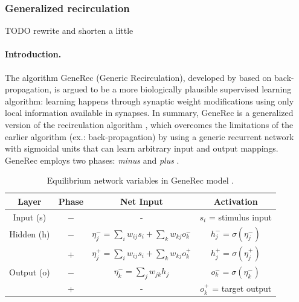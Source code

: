 \subsubsection{Generalized recirculation}
\label{models-generec} 

TODO rewrite and shorten a little 

\paragraph{Introduction.} 
The algorithm GeneRec (Generic Recirculation), developed by \citet{o1996bio} based on back-propagation, is argued to be a more biologically plausible supervised learning algorithm: learning happens through synaptic weight modifications using only local information available in synapses. In summary, GeneRec is a generalized version of the recirculation algorithm \citet{hinton1988learning}, which overcomes the limitations of the earlier algorithm (ex.: back-propagation) by using a generic recurrent network with sigmoidal units that can learn arbitrary input and output mappings. GeneRec employs two phases: \emph{minus} and \emph{plus} \citep{da2011advances, schneider2009application}. 


\begin{table}
  \centering
  \begin{tabular}{|cccc|}
    \hline
    Layer & Phase & Net Input & Activation\\
    \hline
    Input (s)    & $-$ & - & $s_i$ = stimulus input\\
    \hline
    Hidden (h)   & $-$ & \hspace{0.3cm}$\eta^{-}_j = \sum_i w_{ij}s_i + \sum_k w_{kj}o^{-}_k$\hspace{0.3cm} &
    $h^{-}_j = \sigma(\eta^{-}_j)$\hspace{0.3cm}\\
          &  +  & $\eta^{+}_j = \sum_{i}w_{ij}s_i + \sum_k w_{kj}o^{+}_k$ & $h^{+}_{j} = \sigma(\eta^{+}_j)$ \\
    \hline
    Output (o) & $-$ & $\eta^{-}_k = \sum_j w_{jk}h_j$ & $o^{-}_k = \sigma(\eta^{-}_k)$\\
           &  +  & - & $o^{+}_k$ = target output \\
    \hline
  \end{tabular}
  \caption{Equilibrium network variables in GeneRec model \citet{farkas2013bal}.}
  \label{tab:generec}
\end{table}

